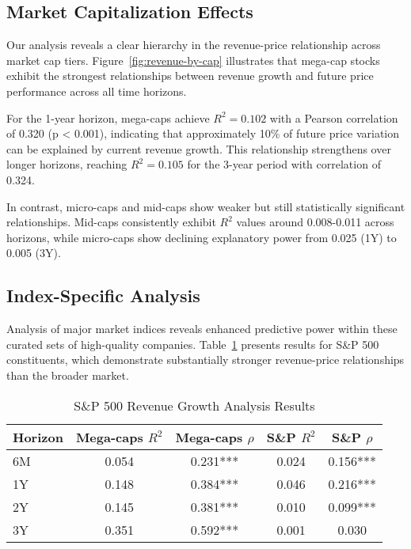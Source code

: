 \documentclass[11pt]{article}
\begin{document}
\vspace{1em}
\FloatBarrier

\subsection{Market Capitalization Effects}

Our analysis reveals a clear hierarchy in the revenue-price relationship across market cap tiers. Figure~\ref{fig:revenue-by-cap} illustrates that mega-cap stocks exhibit the strongest relationships between revenue growth and future price performance across all time horizons.

For the 1-year horizon, mega-caps achieve $R^2 = 0.102$ with a Pearson correlation of 0.320 (p < 0.001), indicating that approximately 10\% of future price variation can be explained by current revenue growth. This relationship strengthens over longer horizons, reaching $R^2 = 0.105$ for the 3-year period with correlation of 0.324.

In contrast, micro-caps and mid-caps show weaker but still statistically significant relationships. Mid-caps consistently exhibit $R^2$ values around 0.008-0.011 across horizons, while micro-caps show declining explanatory power from 0.025 (1Y) to 0.005 (3Y).

\subsection{Index-Specific Analysis}

Analysis of major market indices reveals enhanced predictive power within these curated sets of high-quality companies. Table~\ref{tab:index-results} presents results for S\&P 500 constituents, which demonstrate substantially stronger revenue-price relationships than the broader market.

\begin{table}[!htbp]
\centering
\caption{S\&P 500 Revenue Growth Analysis Results}
\label{tab:index-results}
\begin{tabular}{lcccc}
\toprule
Horizon & Mega-caps $R^2$ & Mega-caps $\rho$ & S\&P $R^2$ & S\&P $\rho$ \\
\midrule
6M & 0.054 & 0.231*** & 0.024 & 0.156*** \\
1Y & 0.148 & 0.384*** & 0.046 & 0.216*** \\
2Y & 0.145 & 0.381*** & 0.010 & 0.099*** \\
3Y & 0.351 & 0.592*** & 0.001 & 0.030 \\
\bottomrule
\end{tabular}
\end{table}
\end{document}
